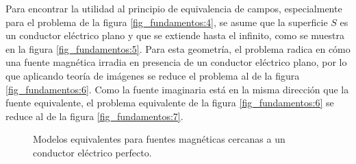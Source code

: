 Para encontrar la utilidad al principio de equivalencia de campos, especialmente para el problema de la figura \ref{fig_fundamentos:4}, se asume que la superficie $S$ es un conductor eléctrico plano y que se extiende hasta el infinito, como se muestra en la figura \ref{fig_fundamentos:5}. Para esta geometría, el problema radica en cómo una fuente magnética irradia en presencia de un conductor eléctrico plano, por lo que aplicando teoría de imágenes se reduce el problema al de la figura \ref{fig_fundamentos:6}. Como la fuente imaginaria está en la misma dirección que la fuente equivalente, el problema equivalente de la figura \ref{fig_fundamentos:6} se reduce al de la figura \ref{fig_fundamentos:7}.
\begin{figure} [H]
\centering 
{}
\caption{Modelos equivalentes para fuentes magnéticas cercanas a un conductor eléctrico perfecto.}
\label{grup_fig_fundamentos:3}
\end{figure}
